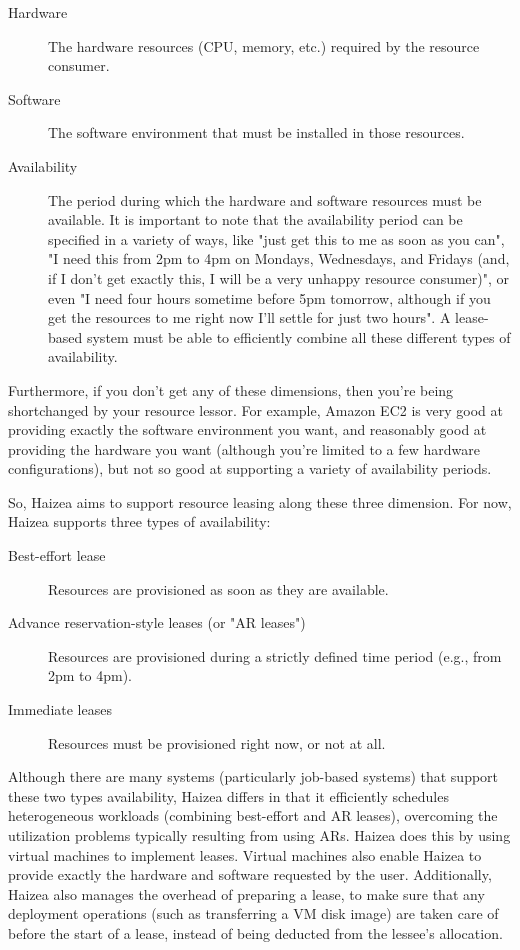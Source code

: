 \begin{description}
 \item[Hardware] The hardware resources (CPU, memory, etc.) required by the resource consumer.
 \item[Software] The software environment that must be installed in those resources.
 \item[Availability] The period during which the hardware and software resources must be available. It is important to note that the availability period can be specified in a variety of ways, like "just get this to me as soon as you can", "I need this from 2pm to 4pm on Mondays, Wednesdays, and Fridays (and, if I don't get exactly this, I will be a very unhappy resource consumer)", or even "I need four hours sometime before 5pm tomorrow, although if you get the resources to me right now I'll settle for just two hours". A lease-based system must be able to efficiently combine all these different types of availability.
\end{description}

Furthermore, if you don't get any of these dimensions, then you're being shortchanged by your resource lessor. For example, Amazon EC2 is very good at providing exactly the software environment you want, and reasonably good at providing the hardware you want (although you're limited to a few hardware configurations), but not so good at supporting a variety of availability periods.

So, Haizea aims to support resource leasing along these three dimension. For now, Haizea supports three types of availability:

\begin{description}
\item[Best-effort lease] Resources are provisioned as soon as they are available.
\item[Advance reservation-style leases (or "AR leases")] Resources are provisioned during a strictly defined time period (e.g., from 2pm to 4pm).
\item[Immediate leases] Resources must be provisioned right now, or not at all.
\end{description}

Although there are many systems (particularly job-based systems) that support these two types availability, Haizea differs in that it efficiently schedules heterogeneous workloads (combining best-effort and AR leases), overcoming the utilization problems typically resulting from using ARs. Haizea does this by using virtual machines to implement leases. Virtual machines also enable Haizea to provide exactly the hardware and software requested by the user. Additionally, Haizea also manages the overhead of preparing a lease, to make sure that any deployment operations (such as transferring a VM disk image) are taken care of before the start of a lease, instead of being deducted from the lessee's allocation.

